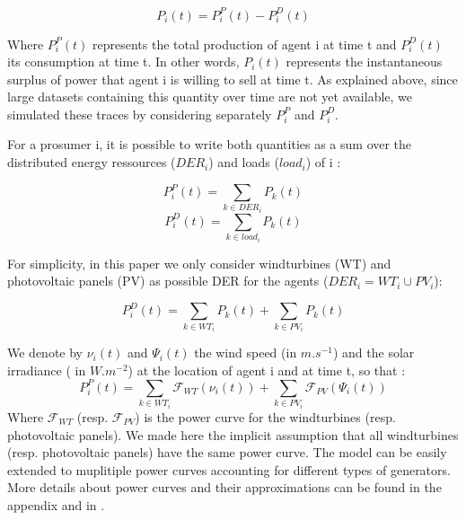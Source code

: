 \documentclass[conference]{IEEEtran}
\begin{document}
\begin{equation}
P_{i}(t) = P_{i}^{P}(t) - P_{i}^{D}(t)
\end{equation}

Where $ P_{i}^{P}(t) $ represents the total production of agent i at time t and $ P_{i}^{D}(t) $ its consumption at time t. In other words, $ P_{i}(t) $ represents the instantaneous surplus of power that agent i is willing to sell at time t. As explained above, since large datasets containing this quantity over time are not yet available, we simulated these traces by considering separately $ P_{i}^{P} $ and $ P_{i}^{D} $.

For a prosumer i, it is possible to write both quantities as a sum over the distributed energy ressources ($ DER_{i} $) and loads ($ load_{i} $) of i : 

\begin{equation}
P_{i}^{P}(t) = \sum_{k \in DER_{i}} P_{k}(t)
\end{equation}
\begin{equation}
P_{i}^{D}(t) = \sum_{k \in load_{i}} P_{k}(t)
\end{equation}

For simplicity, in this paper we only consider windturbines (WT) and photovoltaic panels (PV) as possible DER for the agents ($ DER_{i} = WT_{i} \cup PV_{i} $):  

\begin{equation}
P_{i}^{D}(t) = \sum_{k \in WT_{i}} P_{k}(t) + \sum_{k \in PV_{i}} P_{k}(t)
\end{equation} 

We denote by $ \nu_{i}(t) $ and $ \Psi_{i}(t) $ the wind speed (in $ m.s^{-1} $) and the solar irradiance ( in $ W.m^{-2} $) at the location of agent i and at time t, so that :
\begin{equation}
 P_{i}^{P}(t) = \sum_{k \in WT_{i}} \mathcal{F}_{WT}( \nu_{i}(t) ) + \sum_{k \in PV_{i} } \mathcal{F}_{PV}(\Psi_{i}(t) ) 
\end{equation}
Where $ \mathcal{F}_{WT} $ (resp. $ \mathcal{F}_{PV} $) is the power curve for the windturbines (resp. photovoltaic panels). We made here the implicit assumption that all windturbines (resp. photovoltaic panels) have the same power curve. The model can be easily extended to muplitiple power curves accounting for different types of generators. More details about power curves and their approximations can be found in the appendix and in \cite{Lydia2014}. 
\end{document}
